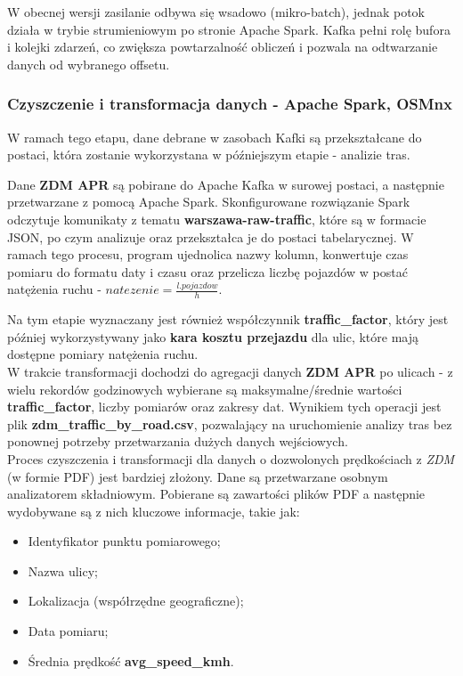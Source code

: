 \documentclass[12pt]{article}
\begin{document}
W obecnej wersji zasilanie odbywa się wsadowo (mikro-batch), jednak potok działa w trybie
strumieniowym po stronie Apache Spark. Kafka pełni rolę bufora i kolejki zdarzeń,
co zwiększa powtarzalność obliczeń i pozwala na odtwarzanie danych od wybranego offsetu.

\subsubsection{Czyszczenie i transformacja danych - Apache Spark, OSMnx}
\label{sssec:czyszczenie}
W ramach tego etapu, dane debrane w zasobach Kafki są przekształcane do postaci, która zostanie wykorzystana w późniejszym etapie - analizie tras.

Dane \textbf{ZDM APR} są pobirane do Apache Kafka w surowej postaci, a następnie przetwarzane z pomocą Apache Spark. Skonfigurowane rozwiązanie Spark
odczytuje komunikaty z tematu \textbf{warszawa-raw-traffic}, które są w formacie JSON, po czym analizuje oraz przekształca je do postaci tabelarycznej.
W ramach tego procesu, program ujednolica nazwy kolumn, konwertuje czas pomiaru do formatu daty i czasu oraz przelicza liczbę pojazdów w postać 
natężenia ruchu - $natezenie = \frac{l. pojazdow}{h}$.

Na tym etapie wyznaczany jest również współczynnik \textbf{traffic\_factor}, który jest później wykorzystywany jako \textbf{kara kosztu przejazdu}
dla ulic, które mają dostępne pomiary natężenia ruchu.\\

W trakcie transformacji dochodzi do agregacji danych \textbf{ZDM APR} po ulicach - z wielu rekordów godzinowych wybierane są maksymalne/średnie wartości 
\textbf{traffic\_factor}, liczby pomiarów oraz zakresy dat. Wynikiem tych operacji jest plik \textbf{zdm\_traffic\_by\_road.csv}, pozwalający na 
uruchomienie analizy tras bez ponownej potrzeby przetwarzania dużych danych wejściowych.\\

Proces czyszczenia i transformacji dla danych o dozwolonych prędkościach z \emph{ZDM} (w formie PDF) jest bardziej złożony.
Dane są przetwarzane osobnym analizatorem składniowym. Pobierane są zawartości plików PDF a następnie wydobywane są z nich kluczowe informacje, takie jak:
\begin{itemize}
    \item Identyfikator punktu pomiarowego;
    \item Nazwa ulicy;
    \item Lokalizacja (współrzędne geograficzne);
    \item Data pomiaru;
    \item Średnia prędkość \textbf{avg\_speed\_kmh}.
    
\end{itemize}
\end{document}
